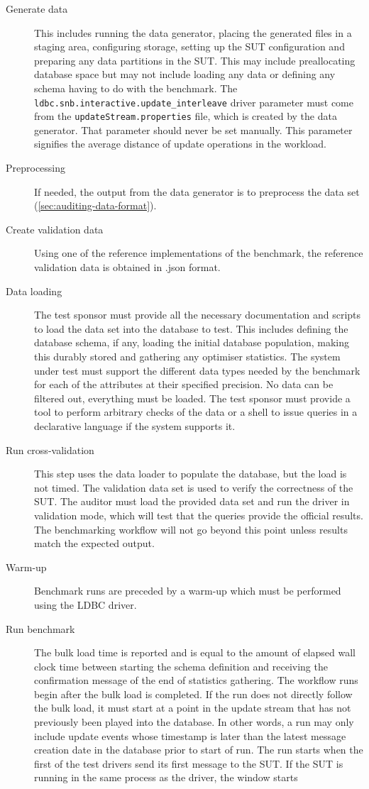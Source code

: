 \begin{description}
    \item[Generate data] This includes running the data generator, placing the generated files in a staging area, configuring storage, setting up the SUT configuration and preparing any data partitions in the SUT. This may include preallocating database space but may not include loading any data or defining any schema having to do with the benchmark. The \verb|ldbc.snb.interactive.update_interleave| driver parameter must come from the \verb|updateStream.properties| file, which is created by the data generator. That parameter should never be set manually. This parameter signifies the average distance of update operations in the workload.
    \item[Preprocessing] If needed, the output from the data generator is to preprocess the data set (\autoref{sec:auditing-data-format}).
    \item[Create validation data] Using one of the reference implementations of the benchmark, the reference validation data is obtained in .json format.
    \item[Data loading] The test sponsor must provide all the necessary documentation and scripts to load the data set into the database to test.
    This includes defining the database schema, if any, loading the initial database population, making this durably stored and gathering any optimiser statistics.
    The system under test must support the different data types needed by the benchmark for each of the attributes at their specified precision. No data can be filtered out, everything must be loaded. The test sponsor must provide a tool to perform arbitrary checks of the data or a shell to issue queries in a declarative language if the system supports it.
    \item[Run cross-validation] This step uses the data loader to populate the database, but the load is not timed. The validation data set is used to verify the correctness of the SUT. The auditor must load the provided data set and run the driver in validation mode, which will test that the queries provide the official results.  The benchmarking workflow will not go beyond this point unless results match the expected output.
    \item[Warm-up] Benchmark runs are preceded by a warm-up which must be performed using the LDBC driver.
    \item[Run benchmark] The bulk load time is reported and is equal to the amount of elapsed wall clock time between starting the schema definition and receiving the confirmation message of the end of statistics gathering. The workflow runs begin after the bulk load is completed. If the run does not directly follow the bulk load, it must start at a point in the update stream that has not previously been played into the database. In other words, a run may only include update events whose timestamp is later than the latest message creation date in the database prior to start of run. The run starts when the first of the test drivers send its first message to the SUT. If the SUT is running in the same process as the driver, the window starts

\end{description}
